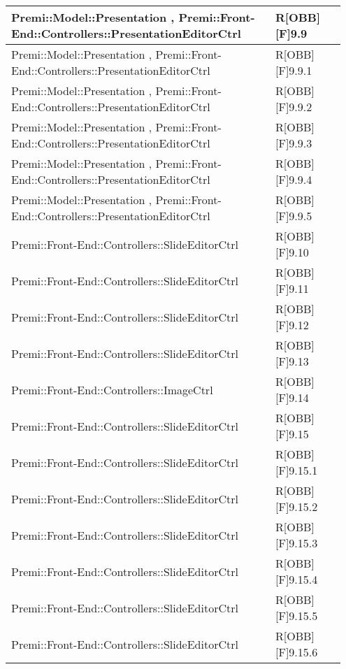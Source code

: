 \begin{table}[h]
	\begin{center}
		\begin{tabular}{|p{0.75\linewidth}|p{0.2\linewidth}|}
			\toprule
			Premi::Model::Presentation , Premi::Front-End::Controllers::PresentationEditorCtrl & R[OBB][F]9.9 \\
		\midrule
			Premi::Model::Presentation , Premi::Front-End::Controllers::PresentationEditorCtrl & R[OBB][F]9.9.1 \\
		\midrule
			Premi::Model::Presentation , Premi::Front-End::Controllers::PresentationEditorCtrl & R[OBB][F]9.9.2 \\
		\midrule
			Premi::Model::Presentation , Premi::Front-End::Controllers::PresentationEditorCtrl & R[OBB][F]9.9.3 \\
		\midrule
			Premi::Model::Presentation , Premi::Front-End::Controllers::PresentationEditorCtrl & R[OBB][F]9.9.4 \\
		\midrule
			Premi::Model::Presentation , Premi::Front-End::Controllers::PresentationEditorCtrl & R[OBB][F]9.9.5 \\
		\midrule
			Premi::Front-End::Controllers::SlideEditorCtrl & R[OBB][F]9.10 \\
		\midrule
			Premi::Front-End::Controllers::SlideEditorCtrl & R[OBB][F]9.11 \\
		\midrule
			Premi::Front-End::Controllers::SlideEditorCtrl & R[OBB][F]9.12 \\
		\midrule
			Premi::Front-End::Controllers::SlideEditorCtrl & R[OBB][F]9.13 \\
		\midrule
			Premi::Front-End::Controllers::ImageCtrl & R[OBB][F]9.14 \\
		\midrule
			Premi::Front-End::Controllers::SlideEditorCtrl & R[OBB][F]9.15 \\
		\midrule
			Premi::Front-End::Controllers::SlideEditorCtrl & R[OBB][F]9.15.1 \\
		\midrule
			Premi::Front-End::Controllers::SlideEditorCtrl & R[OBB][F]9.15.2 \\
		\midrule
			Premi::Front-End::Controllers::SlideEditorCtrl & R[OBB][F]9.15.3 \\
		\midrule
			Premi::Front-End::Controllers::SlideEditorCtrl & R[OBB][F]9.15.4 \\
		\midrule
			Premi::Front-End::Controllers::SlideEditorCtrl & R[OBB][F]9.15.5 \\
		\midrule
			Premi::Front-End::Controllers::SlideEditorCtrl & R[OBB][F]9.15.6 \\
		\midrule

\end{tabular}
\end{center}
\end{table}
